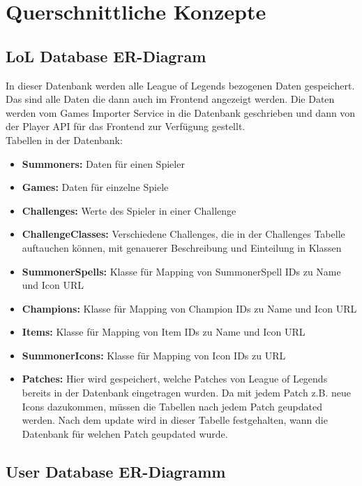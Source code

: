 \section{Querschnittliche Konzepte}

\subsection{LoL Database ER-Diagram}
In dieser Datenbank werden alle League of Legends bezogenen Daten gespeichert. Das sind alle Daten die dann auch im Frontend angezeigt werden. Die Daten werden vom Games Importer Service in die Datenbank geschrieben und dann von der Player API für das Frontend zur Verfügung gestellt.\\
Tabellen in der Datenbank:\\
\begin{itemize}
\item \textbf{Summoners:} Daten für einen Spieler
\item \textbf{Games:} Daten für einzelne Spiele
\item \textbf{Challenges:} Werte des Spieler in einer Challenge
\item \textbf{ChallengeClasses:} Verschiedene Challenges, die in der Challenges Tabelle auftauchen können, mit genauerer Beschreibung und Einteilung in Klassen
\item \textbf{SummonerSpells:} Klasse für Mapping von SummonerSpell IDs zu Name und Icon URL
\item \textbf{Champions:} Klasse für Mapping von Champion IDs zu Name und Icon URL
\item \textbf{Items:} Klasse für Mapping von Item IDs zu Name und Icon URL
\item \textbf{SummonerIcons:} Klasse für Mapping von Icon IDs zu URL
\item \textbf{Patches:} Hier wird gespeichert, welche Patches von League of Legends bereits in der Datenbank eingetragen wurden. Da mit jedem Patch z.B. neue Icons dazukommen, müssen die Tabellen nach jedem Patch geupdated werden. Nach dem update wird in dieser Tabelle festgehalten, wann die Datenbank für welchen Patch geupdated wurde.
\end{itemize}

\subsection{User Database ER-Diagramm}

